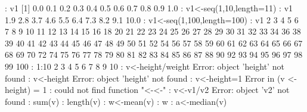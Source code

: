 \documentclass[10pt,a4paper]{article}
\begin{document}
{{: v1
[1] 0.0 0.1 0.2 0.3 0.4 0.5 0.6 0.7 0.8 0.9 1.0
\newline
: v1<-seq(1,10,length=11)
\newline
: v1
  1.9  2.8  3.7  4.6  5.5  6.4  7.3  8.2  9.1 10.0
\newline
: v1<-seq(1,100,length=100)
\newline
: v1
   2   3   4   5   6   7   8   9  10  11  12  13  14  15  16    18
  20  21  22  23  24  25  26  27  28  29  30  31  32  33  34    36
  38  39  40  41  42  43  44  45  46  47  48  49  50  51  52    54
  56  57  58  59  60  61  62  63  64  65  66  67  68  69  70    72
  74  75  76  77  78  79  80  81  82  83  84  85  86  87  88    90
  92  93  94  95  96  97  98  99 100
\newline
: 1:10
  2  3  4  5  6  7  8  9 10
\newline
: v<-height/weight
\newline
Error: object 'height' not found
\newline
: v<-height
\newline
Error: object 'height' not found
\newline
: v<-height=1
\newline
Error in (v <- height) = 1 : could not find function "<-<-"
\newline
: v<-v1/v2
\newline
Error: object 'v2' not found
\newline
: sum(v)
\newline
: length(v)
\newline
: w<-mean(v)
\newline
: w
\newline
: a<-median(v)
\newline
}}
\end{document}
